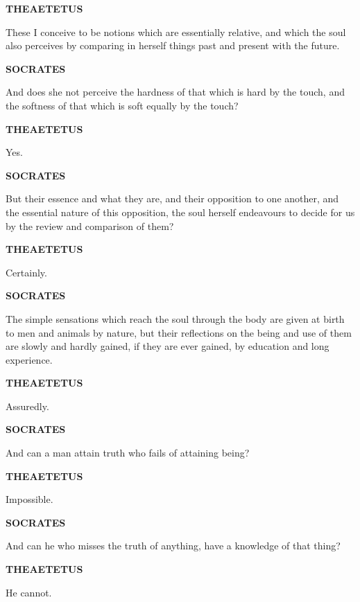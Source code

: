 \documentclass[11pt,letter]{article}
\begin{document}
\par \textbf{THEAETETUS}
\par   These I conceive to be notions which are essentially relative, and which the soul also perceives by comparing in herself things past and present with the future.

\par \textbf{SOCRATES}
\par   And does she not perceive the hardness of that which is hard by the touch, and the softness of that which is soft equally by the touch?

\par \textbf{THEAETETUS}
\par   Yes.

\par \textbf{SOCRATES}
\par   But their essence and what they are, and their opposition to one another, and the essential nature of this opposition, the soul herself endeavours to decide for us by the review and comparison of them?

\par \textbf{THEAETETUS}
\par   Certainly.

\par \textbf{SOCRATES}
\par   The simple sensations which reach the soul through the body are given at birth to men and animals by nature, but their reflections on the being and use of them are slowly and hardly gained, if they are ever gained, by education and long experience.

\par \textbf{THEAETETUS}
\par   Assuredly.

\par \textbf{SOCRATES}
\par   And can a man attain truth who fails of attaining being?

\par \textbf{THEAETETUS}
\par   Impossible.

\par \textbf{SOCRATES}
\par   And can he who misses the truth of anything, have a knowledge of that thing?

\par \textbf{THEAETETUS}
\par   He cannot.
\end{document}

